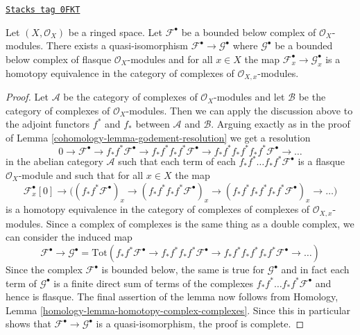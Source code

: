 \begin{lemma}
\label{cohomology-lemma-godement-resolution-bounded-below}
\href{https://stacks.math.columbia.edu/tag/0FKT}{\texttt{Stacks tag 0FKT}}

Let $(X, \mathcal{O}_X)$ be a ringed space. Let
$\mathcal{F}^\bullet$ be a bounded below complex of
$\mathcal{O}_X$-modules. There exists a quasi-isomorphism
$\mathcal{F}^\bullet \to \mathcal{G}^\bullet$
where $\mathcal{G}^\bullet$ be a bounded below complex of flasque
$\mathcal{O}_X$-modules and for all $x \in X$ the
map $\mathcal{F}^\bullet_x \to \mathcal{G}^\bullet_x$
is a homotopy equivalence in the category of complexes
of $\mathcal{O}_{X, x}$-modules.
\end{lemma}

\begin{proof}

Let $\mathcal{A}$ be the category of complexes of $\mathcal{O}_X$-modules
and let $\mathcal{B}$ be the category of complexes of $\mathcal{O}_X$-modules.
Then we can apply the discussion above to the adjoint functors
$f^*$ and $f_*$ between $\mathcal{A}$ and $\mathcal{B}$.
Arguing exactly as in the proof of
Lemma \ref{cohomology-lemma-godement-resolution}
we get a resolution
$$
0 \to
\mathcal{F}^\bullet \to
f_*f^*\mathcal{F}^\bullet \to
f_*f^*f_*f^*\mathcal{F}^\bullet \to
f_*f^*f_*f^*f_*f^*\mathcal{F}^\bullet \to \ldots
$$
in the abelian category $\mathcal{A}$ such that each term of each
$f_*f^*\ldots f_*f^*\mathcal{F}^\bullet$ is a flasque
$\mathcal{O}_X$-module and such that for all $x \in X$ the
map
$$
\mathcal{F}^\bullet_x[0] \to \Big(
(f_*f^*\mathcal{F}^\bullet)_x \to
(f_*f^*f_*f^*\mathcal{F}^\bullet)_x \to
(f_*f^*f_*f^*f_*f^*\mathcal{F}^\bullet)_x \to \ldots
\Big)
$$
is a homotopy equivalence in the category of complexes of complexes
of $\mathcal{O}_{X, x}$-modules. Since a complex of complexes is the
same thing as a double complex, we can consider the induced map
$$
\mathcal{F}^\bullet \to
\mathcal{G}^\bullet =
\text{Tot}(
f_*f^*\mathcal{F}^\bullet \to
f_*f^*f_*f^*\mathcal{F}^\bullet \to
f_*f^*f_*f^*f_*f^*\mathcal{F}^\bullet \to \ldots
)
$$
Since the complex $\mathcal{F}^\bullet$ is bounded below, the
same is true for $\mathcal{G}^\bullet$ and in fact each term
of $\mathcal{G}^\bullet$ is a finite direct sum of
terms of the complexes $f_*f^*\ldots f_*f^*\mathcal{F}^\bullet$
and hence is flasque. The final assertion of the lemma
now follows from
Homology, Lemma \ref{homology-lemma-homotopy-complex-complexes}.
Since this in particular shows that
$\mathcal{F}^\bullet \to \mathcal{G}^\bullet$
is a quasi-isomorphism, the proof is complete.
\end{proof}

